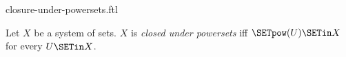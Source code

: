 \documentclass{naproche-library}
\begin{document}
\begin{smodule}[title=Closure Under Powersets]{closure-under-powersets.ftl}

\begin{definition}[forthel,id=FOUNDATIONS_14_4652013578120594]
  Let $X$ be a system of sets.
  $X$ is \emph{closed under powersets} iff $\SETpow(U) \SETin X$ for every $U \SETin X$.
\end{definition}
\end{smodule}
\end{document}
